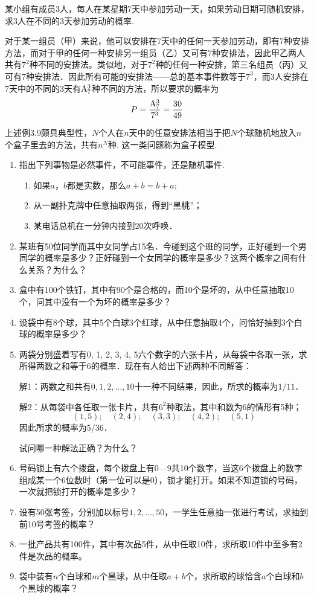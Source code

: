 \begin{example}
    某小组有成员3人，每人在某星期7天中参加劳动一天，如果劳动日期可随机安排，求3人在不同的3天参加劳动的概率.
\end{example}

\begin{solution}
    对于某一组员（甲）来说，他可以安排在7天中的任何一天参加劳动，即有7种安排方法，而对于甲的任何一种安排另一组员（乙）又可有7种安排法，因此甲乙两人共有$7^2$种不同的安排法。类似地，对于$7^2$种的任何一种安排，第三名组员（丙）又可有7种安排法．因此所有可能的安排法——总的基本事件数等于$7^3$，而3人安排在7天中的不同的3天有${\rm A}^3_7$种不同的方法，所以要求的概率为
\[P=\frac{{\rm A}^3_7}{7^3}=\frac{30}{49}\]
\end{solution}

上述例3.9颇具典型性，$N$个人在$n$天中的任意安排法相当于把$N$个球随机地放入$n$个盒子里去的方法，共有$n^N$种. 这一类问题称为盒子模型.

\begin{ex}
\begin{enumerate}
    \item 指出下列事物是必然事件，不可能事件，还是随机事件.
\begin{enumerate}[(1)]
\item 如果$a$，$b$都是实数，那么$a+b=b+a$;
\item 从一副扑克牌中任意抽取两张，得到“黑桃”；
\item 某电话总机在一分钟内接到20次呼唤．
\end{enumerate}
\item 某班有50位同学而其中女同学占15名．今碰到这个班的同学，正好碰到一个男同学的概率是多少？正好碰到一个女同学的概率是多少？这两个概率之间有什么关系？为什么？
\item 盒中有100个铁钉，其中有90个是合格的，而10个是坏的，从中任意抽取10个，问其中没有一个为坏的概率是多少？
\item 设袋中有8个球，其中5个白球3个红球，从中任意抽取4个，问恰好抽到3个白球的概率是多少？
\item 两袋分别盛着写有0, 1, 2, 3, 4, 5六个数字的六张卡片，从每袋中各取一张，求所得两数之和等于6的概率．现在有人给出下述两种不同解答：

解1：两数之和共有$0,1,2,\ldots,10$十一种不同结果，因此，所求的概率为$1/11$．

解2：从每袋中各任取一张卡片，共有$6^2$种取法，其中和数为6的情形有5种；
\[(1,5);\quad (2,4);\quad (3,3);\quad (4,2);\quad (5,1)\]
因此所求的概率为$5/36$．

试问哪一种解法正确？为什么？
\item 号码锁上有六个拨盘，每个拨盘上有0—9共10个数字，当这6个拨盘上的数字组成某一个6位数时（第一位可以是0），锁才能打开。如果不知道锁的号码，一次就把锁打开的概率是多少？
\item 设有50张考签，分别加以标号$1,2,\ldots,50$，一学生任意抽一张进行考试，求抽到前10号考签的概率？
\item 一批产品共有100件，其中有次品5件，从中任取10件，求所取10件中至多有2件是次品的概率。
\item 袋中装有$n$个白球和$m$个黑球，从中任取$a+b$个，求所取的球恰含$a$个白球和$b$个黑球的概率？
\end{enumerate}
\end{ex}

